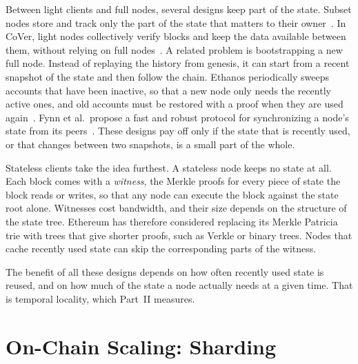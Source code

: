 Between light clients and full nodes, several designs keep part of the state.
Subset nodes store and track only the part of the state that matters to their owner~\cite{paavolainen2021subset}.
In CoVer, light nodes collectively verify blocks and keep the data available between them, without relying on full nodes~\cite{cao2020cover}. 
A related problem is bootstrapping a new full node.
Instead of replaying the history from genesis, it can start from a recent snapshot of the state and then follow the chain.
Ethanos periodically sweeps accounts that have been inactive, so that a new node only needs the recently active ones, and old accounts must be restored with a proof when they are used again~\cite{kim2021ethanos}. 
Fynn et al.\ propose a fast and robust protocol for synchronizing a node's state from its peers~\cite{fynn2022robust}. 
These designs pay off only if the state that is recently used, or that changes between two snapshots, is a small part of the whole.

Stateless clients take the idea furthest.
A stateless node keeps no state at all.
Each block comes with a \emph{witness}, the Merkle proofs for every piece of state the block reads or writes, so that any node can execute the block against the state root alone.
Witnesses cost bandwidth, and their size depends on the structure of the state tree.
Ethereum has therefore considered replacing its Merkle Patricia trie with trees that give shorter proofs, such as Verkle or binary trees. 
Nodes that cache recently used state can skip the corresponding parts of the witness.

The benefit of all these designs depends on how often recently used state is reused, and on how much of the state a node actually needs at a given time.
That is temporal locality, which Part~II measures.

\section{On-Chain Scaling: Sharding}\label{sec:bg:sharding}


